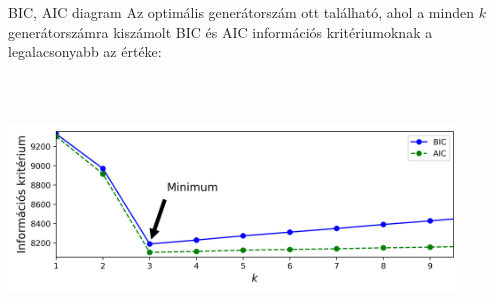 \documentclass[english, aspectratio=169]{beamer}
\begin{document}
\begin{frame}{BIC, AIC diagram}
Az optimális generátorszám ott található, ahol a minden $k$ generátorszámra kiszámolt BIC és AIC információs kritériumoknak a legalacsonyabb az értéke:\par\smallskip
\begin{center}
\includegraphics[width=12cm, height=7cm, keepaspectratio]{images/generative_32.png}
\end{center}
\end{frame}
\end{document}
